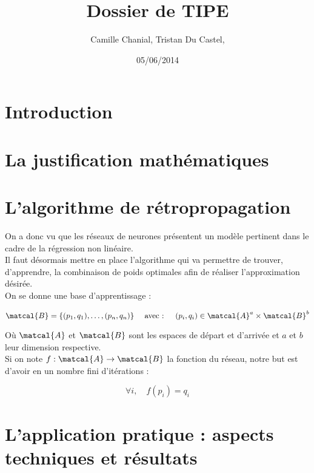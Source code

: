 \documentclass[a4paper, 11pt]{article}
\begin{document}
 
\title{Dossier de TIPE}
\author{Camille Chanial, Tristan Du Castel, }
\date{05/06/2014} 
 
\maketitle

 
\tableofcontents
 

\newpage

\section{Introduction}
\section{La justification mathématiques}
\section{L'algorithme de rétropropagation}

On a donc vu que les réseaux de neurones présentent un modèle pertinent dans le cadre de la régression non linéaire.\\
Il faut désormais mettre en place l'algorithme qui va permettre de trouver, d'apprendre, la combinaison de poids optimales afin de réaliser l'approximation désirée.\\
On se donne une base d'apprentissage :

$$\matcal{B} = \{(p_1,q_1), \dots, (p_n, q_n)\} \quad \text{ avec : } \quad (p_i,q_i) \in \matcal{A}^a \times \matcal{B}^b$$

Où $\matcal{A}$ et $\matcal{B}$ sont les espaces de départ et d'arrivée et $a$ et $b$ leur dimension respective.\\
Si on note $f:\matcal{A}\to \matcal{B}$ la fonction du réseau, notre but est d'avoir en un nombre fini d'itérations :

$$ \forall i, \quad f(p_i) = q_i $$





\section{L'application pratique : aspects techniques et résultats}

 
\end{document}
